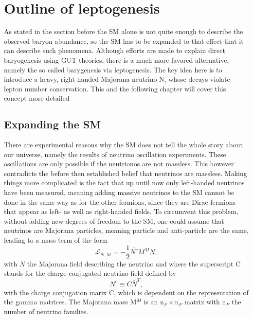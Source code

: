 \chapter{Outline of leptogenesis}
As stated in the section before the SM alone is not quite enough to describe the observed baryon abundance, so the SM has to be expanded to that effect that it can describe such phenomena. \newline\indent
Although efforts are made to explain direct baryogenesis using GUT theories, there is a much more favored alternative, namely the so called barygenesis via leptogenesis. The key idea here is to introduce a heavy, right-handed Majorana neutrino N, whose decays violate lepton number conservation. \newline\indent
This and the following chapter will cover this concept more detailed
\section{Expanding the SM}
There are experimental reasons why the SM does not tell the whole story about our universe, namely the results of neutrino oscillation experiments. These oscillations are only possible if the neutrionos are not massless. This however contradicts the before then established belief that neutrinos are massless. Making things more complicated is the fact that up until now only left-handed neutrinos have been measured, meaning adding massive neutrinos to the SM cannot be done in the same way as for the other fermions, since they are Dirac fermions that appear as left- as well as right-handed fields. To circumvent this problem, without adding new degrees of freedom to the SM, one could assume that neutrinos are Majorana particles, meaning particle and anti-particle are the same, leading to a mass term of the form\cite[p. 18]{Taanila:2008}
\begin{equation}
\mathcal{L}_{N,M}=-\frac{1}{2}\overline{N^c}M^MN,
\label{eq:neutrino_majorana}
\end{equation}
with $N$ the Majorana field describing the neutrino and where the superscript C stands for the charge conjugated neutrino field defined by
\begin{equation*}
	N^c\equiv C\bar{N}^T,
\end{equation*}
with the charge conjugation marix C, which is dependent on the representation of the gamma matrices. The Majorana mass M$^M$ is an n$_F\times$n$_F$ matrix with n$_F$ the number of neutrino families. \newline\indent

